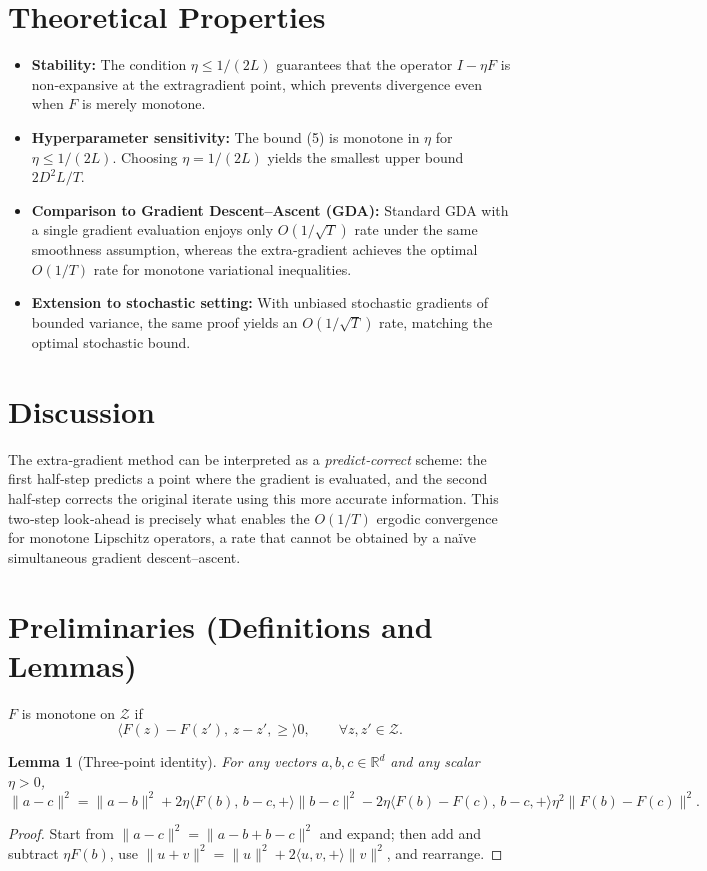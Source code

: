 \documentclass{article}
\newtheorem{lemma}{Lemma}
\newcommand{\ip}[2]{\langle #1,#2\rangle}
\begin{document}
\section*{Theoretical Properties}
\begin{itemize}[leftmargin=*,noitemsep]
\item \textbf{Stability:} The condition $\eta\le 1/(2L)$ guarantees that the
operator $I-\eta F$ is non‑expansive at the extragradient point, which
prevents divergence even when $F$ is merely monotone.
\item \textbf{Hyperparameter sensitivity:} The bound (5) is monotone in
$\eta$ for $\eta\le 1/(2L)$. Choosing $\eta=1/(2L)$ yields the smallest
upper bound $2D^{2}L/T$.
\item \textbf{Comparison to Gradient Descent–Ascent (GDA):}
Standard GDA with a single gradient evaluation enjoys only
$O(1/\sqrt{T})$ rate under the same smoothness assumption, whereas the
extra‑gradient achieves the optimal $O(1/T)$ rate for monotone variational
inequalities.
\item \textbf{Extension to stochastic setting:} With unbiased stochastic
gradients of bounded variance, the same proof yields an
$O(1/\sqrt{T})$ rate, matching the optimal stochastic bound.
\end{itemize}

\section*{Discussion}
The extra‑gradient method can be interpreted as a \emph{predict‑correct}
scheme: the first half‑step predicts a point where the gradient is evaluated,
and the second half‑step corrects the original iterate using this more
accurate information. This two‑step look‑ahead is precisely what enables the
$O(1/T)$ ergodic convergence for monotone Lipschitz operators, a rate that
cannot be obtained by a naïve simultaneous gradient descent–ascent.

\newpage
\section*{Preliminaries (Definitions and Lemmas)}
\begin{definition}
$F$ is monotone on $\mathcal Z$ if
\[
\ip{F(z)-F(z'),\,z-z'}\ge 0,\qquad\forall z,z'\in\mathcal Z .
\tag{6}
\]
\end{definition}
\begin{lemma}[Three‑point identity]\label{lem:three}
For any vectors $a,b,c\in\mathbb R^{d}$ and any scalar $\eta>0$,
\[
\|a-c\|^{2}= \|a-b\|^{2}+2\eta\ip{F(b),\,b-c}
            +\|b-c\|^{2}-2\eta\ip{F(b)-F(c),\,b-c}
            +\eta^{2}\|F(b)-F(c)\|^{2}.
\tag{7}
\]
\end{lemma}
\begin{proof}
Start from $\|a-c\|^{2}=\|a-b+b-c\|^{2}$ and expand; then add and subtract
$\eta F(b)$, use $\|u+v\|^{2}=\|u\|^{2}+2\ip{u,v}+\|v\|^{2}$, and rearrange.
\end{proof}
\end{document}
